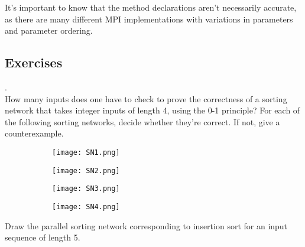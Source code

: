 \documentclass[main]{subfiles}
\begin{document}
It's important to know that the method declarations aren't necessarily accurate, as there are many different MPI implementations with variations in parameters and parameter ordering.

\newpage

\subsection{Exercises}
\begin{ExerciseList}
    \Exercise[title={Sorting Networks},label=SN].\quad \\
        \Question How many inputs does one have to check to prove the correctness of a sorting network that takes integer inputs of length 4, using the 0-1 principle?
        \Question For each of the following sorting networks, decide whether they're correct. If not, give a counterexample.
            \begin{figure}[H]
                \centering
                \begin{subfigure}{.5\textwidth}
                    \centering
                    \texttt{[image: SN1.png]}
                    \caption{}
                \end{subfigure}%
                \begin{subfigure}{.5\textwidth}
                    \centering
                    \texttt{[image: SN2.png]}
                    \caption{}
                \end{subfigure}
                \begin{subfigure}{.5\textwidth}
                    \centering
                    \texttt{[image: SN3.png]}
                    \caption{}
                \end{subfigure}%
                \begin{subfigure}{.5\textwidth}
                    \centering
                    \texttt{[image: SN4.png]}
                    \caption{}
                \end{subfigure}
            \end{figure}
        \Question Draw the parallel sorting network corresponding to insertion sort for an input sequence of length 5.
    

\end{ExerciseList}
\end{document}
